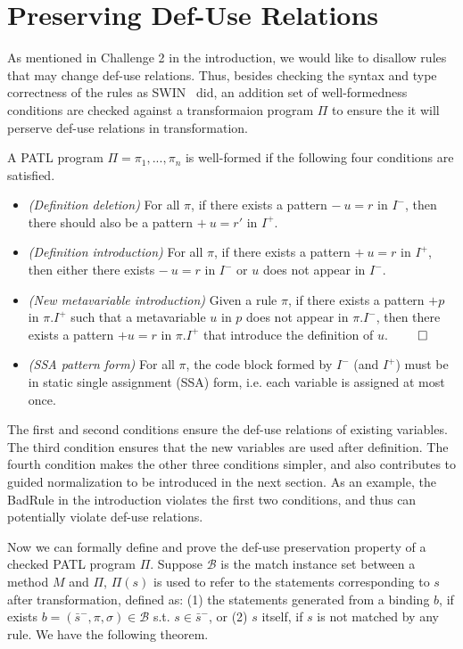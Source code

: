\documentclass[a4paper, USenglish]{lipics-v2016}
\newcommand{\PATL}{PATL\xspace}
\theoremstyle{plain}
\begin{document}

\section{Preserving Def-Use Relations}\label{sec:checker}
As mentioned in Challenge 2 in the introduction, we would like to
disallow rules that may change def-use relations. Thus, besides checking the syntax and type correctness of the rules as SWIN~\cite{Li:2015:STT:2678015.2682534} did, an addition set of well-formedness conditions are checked against a transformaion program $\Pi$ to ensure the it will perserve def-use relations in transformation.

\begin{definition}
A \PATL program $\Pi=\pi_1,...,\pi_n$ is well-formed if the following four conditions are satisfied.
\begin{itemize}
\item \textit{(Definition deletion)} For all $\pi$, if there exists a pattern $-~u=r$ in $I^-$, then there should also be a pattern $+~u=r'$ in $I^+$.
\item \textit{(Definition introduction)} For all $\pi$, if there exists a pattern $+~u=r$ in $I^+$, then either there exists $-~u=r$ in $I^-$ or $u$ does not appear in $I^-$.
\item \textit{(New metavariable introduction)} Given a rule $\pi$, if there exists a pattern $+p$ in $\pi.I^+$ such that a metavariable $u$ in $p$ does not appear in $\pi.I^-$, then there exists a pattern $+u=r$ in $\pi.I^+$ that introduce the definition of $u$. \hfill $\qed$
\item \textit{(SSA pattern form)} For all $\pi$, the code block formed
  by $I^-$ (and $I^+$) must be in static single
  assignment (SSA) form, i.e. each variable is assigned at most once.
\end{itemize}
\end{definition}

The first and second conditions ensure the def-use relations of
existing variables. The third condition ensures that the new variables are
used after definition. The fourth condition makes the other three
conditions simpler, and also contributes to guided normalization
to be introduced in the next section.
As an example, the BadRule in the introduction violates the first two conditions, and thus can potentially violate
def-use relations.

Now we can formally define and prove the def-use preservation property
of a checked \PATL program $\Pi$. Suppose $\mathcal{B}$ is the match
instance set between a method $M$ and $\Pi$, $\Pi(s)$ is used to refer
to the statements corresponding to $s$ after transformation, defined
as: (1) the statements generated from a binding $b$, if exists
$b=(\bar{s}^-,\pi,\sigma)\in \mathcal{B}$ s.t. $s\in\bar{s}^-$,  or (2)
$s$ itself, if $s$ is not matched by any rule. We have the following theorem.
\end{document}
